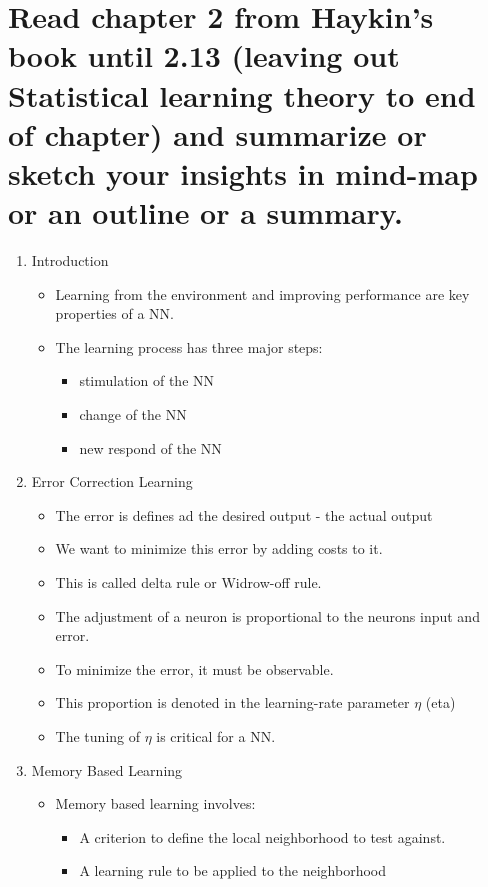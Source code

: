 \documentclass{scrartcl}
\begin{document}
\section{Read chapter 2 from Haykin’s book until 2.13 (leaving out Statistical learning theory to
end of chapter) and summarize or sketch your insights in mind-map or an outline or a
summary.
}
\begin{enumerate}
\item Introduction
	\begin{itemize}
	\item Learning from the environment and improving performance are key properties of a NN.
	\item The learning process has three major steps:
		\begin{itemize}
		\item stimulation of the NN
		\item change of the NN
		\item new respond of the NN
		\end{itemize}
	\end{itemize}
\item Error Correction Learning
	\begin{itemize}
	\item The error is defines ad the desired output - the actual output
	\item We want to minimize this error by adding costs to it. 
	\item This is called delta rule or Widrow-off rule.
	\item The adjustment of a neuron is proportional to the neurons input and error.
	\item To minimize the error, it must be observable.
	\item This proportion is denoted in the learning-rate parameter $\eta$ (eta)
	\item The tuning of $\eta$ is critical for a NN.
	\end{itemize}
\item Memory Based Learning
	\begin{itemize}
	\item Memory based learning involves:
		\begin{itemize}
		\item A criterion to define the local neighborhood to test against.
		\item A learning rule to be applied to the neighborhood
		\end{itemize}
		

\end{itemize}
\end{enumerate}
\end{document}
